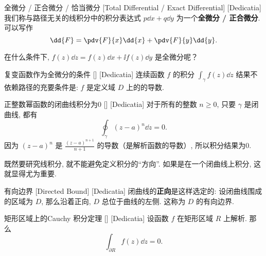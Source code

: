 \documentclass[UTF8]{ctexart}
\begin{document}
        \begin{dfn}
            [ExactDifferential]
            {全微分 / 正合微分 / 恰当微分}
            [Total Differential / Exact Differential]
            [Dedicatia]
            我们称与路径无关的线积分中的积分表达式 \(p\dd{x}+q\dd{y}\) 为一个\textbf{全微分 / 正合微分}. 可以写作
            \[\dd{F}=\pdv{F}{x}\dd{x}+\pdv{F}{y}\dd{y}.\]
        \end{dfn}

        在什么条件下,  \(f(z)\dd{z}=f(z)\dd{x}+\ii f(z)\dd{y}\) 是全微分呢？

        \begin{crl}
            [UUID]
            {复变函数作为全微分的条件}
            []
            [Dedicatia]
            连续函数 \(f\) 的积分 \(\int_\gamma f(z)\dd{z}\) 结果不依赖路径的充要条件是:  \(f\) 是定义域 \(D\) 上的 的导数. 
        \end{crl}

        \begin{xmp}
            [UUID]
            {正整数幂函数的闭曲线积分为0}
            []
            [Dedicatia]
            对于所有的整数 \(n\geqslant 0\), 只要 \(\gamma\) 是闭曲线, 都有
            \[\oint_\gamma (z-a)^n\dd{z}=0.\]
            因为 \((z-a)^n\) 是 \(\frac{(z-a)^{n+1}}{n+1}\) 的导数（是解析函数的导数）, 所以积分结果为0. 
        \end{xmp}

        既然要研究线积分, 就不能避免定义积分的“方向”. 如果是在一个闭曲线上积分, 这就显得尤为重要. 

        \begin{dfn}
            [UUID]
            {有向边界}
            [Directed Bound]
            [Dedicatia]
            闭曲线的\textbf{正向}是这样选定的: 设闭曲线围成的区域为 \(D\), 那么沿着正向,  \(D\) 总位于曲线的左侧. 这称为 \(D\) 的有向边界. 
        \end{dfn}

        \begin{thm}
            [UUID]
            {矩形区域上的Cauchy 积分定理}
            []
            [Dedicatia]
            设函数 \(f\) 在矩形区域 \(R\) 上解析. 那么
            \[\int_{\partial R}f(z)\dd{z}=0.\]
        \end{thm}
\end{document}
